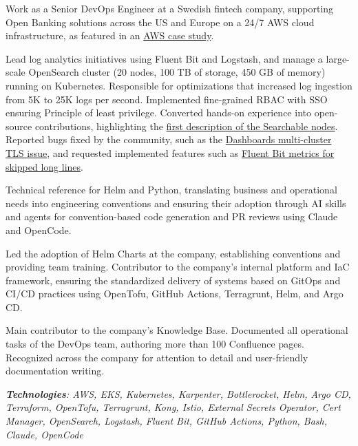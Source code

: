 \documentclass[10pt,a4paper]{altacv}
\begin{document}
\bigskip
\bigskip

Work as a Senior DevOps Engineer at a Swedish fintech company, supporting Open Banking solutions across the US and Europe on a 24/7 AWS cloud infrastructure, as featured in an \href{https://aws.amazon.com/pt/solutions/case-studies/trustly-case-study/}{AWS case study}.

\medskip

Lead log analytics initiatives using Fluent Bit and Logstash, and manage a large-scale OpenSearch cluster (20 nodes, 100 TB of storage, 450 GB of memory) running on Kubernetes. Responsible for optimizations that increased log ingestion from 5K to 25K logs per second. Implemented fine-grained RBAC with SSO ensuring Principle of least privilege. Converted hands-on experience into open-source contributions, highlighting the \href{https://github.com/opensearch-project/documentation-website/pull/4597}{first description of the Searchable nodes}. Reported bugs fixed by the community, such as the \href{https://github.com/opensearch-project/OpenSearch-Dashboards/issues/2829#issuecomment-1611585079}{Dashboards multi-cluster TLS issue}, and requested implemented features such as \href{https://github.com/fluent/fluent-bit/issues/11457}{Fluent Bit metrics for skipped long lines}.

\medskip

Technical reference for Helm and Python, translating business and operational needs into engineering conventions and ensuring their adoption through AI skills and agents for convention-based code generation and PR reviews using Claude and OpenCode.

\medskip

Led the adoption of Helm Charts at the company, establishing conventions and providing team training. Contributor to the company's internal platform and IaC framework, ensuring the standardized delivery of systems based on GitOps and CI/CD practices using OpenTofu, GitHub Actions, Terragrunt, Helm, and Argo CD.

\medskip

Main contributor to the company's Knowledge Base. Documented all operational tasks of the DevOps team, authoring more than 100 Confluence pages. Recognized across the company for attention to detail and user-friendly documentation writing.

\medskip

\textit{\textbf{Technologies}: AWS, EKS, Kubernetes, Karpenter, Bottlerocket, Helm, Argo CD, Terraform, OpenTofu, Terragrunt, Kong, Istio, External Secrets Operator, Cert Manager, OpenSearch, Logstash, Fluent Bit, GitHub Actions, Python, Bash, Claude, OpenCode}
\end{document}
